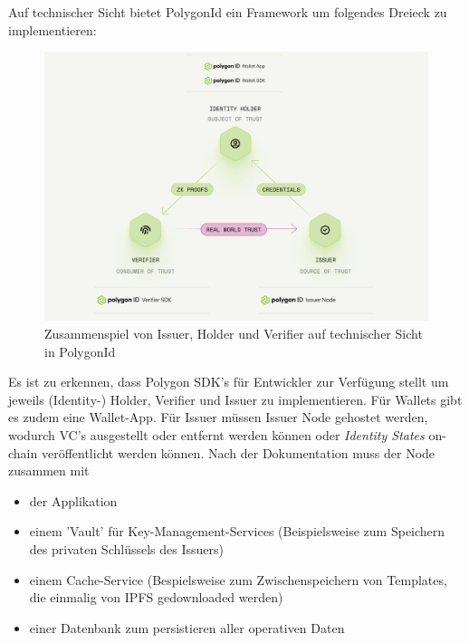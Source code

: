 Auf technischer Sicht bietet PolygonId ein Framework um folgendes Dreieck zu implementieren:
\begin{figure}[h]
	\centering
	\includegraphics[scale=0.3]{media/polygonIddreieck_inv.png}
	\caption{Zusammenspiel von Issuer, Holder und Verifier auf technischer Sicht in PolygonId \cite{ID31}}
	\label{fig:meine-grafik}
\end{figure}

Es ist zu erkennen, dass Polygon SDK's für Entwickler zur Verfügung stellt um jeweils (Identity-) Holder, Verifier und Issuer zu implementieren. Für Wallets gibt es zudem eine Wallet-App. Für Issuer müssen Issuer Node gehostet werden, wodurch VC's ausgestellt oder entfernt werden können oder \textsl{Identity States} on-chain veröffentlicht werden können. Nach der Dokumentation \cite{ID38} muss der Node zusammen mit 

\begin{itemize}
	\item der Applikation
	\item einem 'Vault' für Key-Management-Services (Beispielsweise zum Speichern des privaten Schlüssels des Issuers)
	\item einem Cache-Service (Bespielsweise zum Zwischenspeichern von Templates, die einmalig von IPFS gedownloaded werden)
	\item einer Datenbank zum persistieren aller operativen Daten
\end{itemize}

